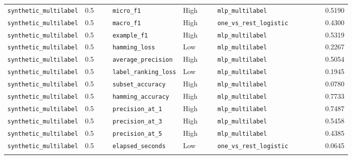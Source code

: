 \documentclass[11pt]{article}
\begin{document}
\begin{longtable}{p{0.18\linewidth} p{0.08\linewidth} p{0.20\linewidth} p{0.10\linewidth} p{0.25\linewidth} r}
\texttt{synthetic\_multilabel} & 0.5 & \texttt{micro\_f1} & High & \texttt{mlp\_multilabel} & 0.5190 \\
\texttt{synthetic\_multilabel} & 0.5 & \texttt{macro\_f1} & High & \texttt{one\_vs\_rest\_logistic} & 0.4300 \\
\texttt{synthetic\_multilabel} & 0.5 & \texttt{example\_f1} & High & \texttt{mlp\_multilabel} & 0.5319 \\
\texttt{synthetic\_multilabel} & 0.5 & \texttt{hamming\_loss} & Low & \texttt{mlp\_multilabel} & 0.2267 \\
\texttt{synthetic\_multilabel} & 0.5 & \texttt{average\_precision} & High & \texttt{mlp\_multilabel} & 0.5054 \\
\texttt{synthetic\_multilabel} & 0.5 & \texttt{label\_ranking\_loss} & Low & \texttt{mlp\_multilabel} & 0.1945 \\
\texttt{synthetic\_multilabel} & 0.5 & \texttt{subset\_accuracy} & High & \texttt{mlp\_multilabel} & 0.0780 \\
\texttt{synthetic\_multilabel} & 0.5 & \texttt{hamming\_accuracy} & High & \texttt{mlp\_multilabel} & 0.7733 \\
\texttt{synthetic\_multilabel} & 0.5 & \texttt{precision\_at\_1} & High & \texttt{mlp\_multilabel} & 0.7487 \\
\texttt{synthetic\_multilabel} & 0.5 & \texttt{precision\_at\_3} & High & \texttt{mlp\_multilabel} & 0.5458 \\
\texttt{synthetic\_multilabel} & 0.5 & \texttt{precision\_at\_5} & High & \texttt{mlp\_multilabel} & 0.4385 \\
\texttt{synthetic\_multilabel} & 0.5 & \texttt{elapsed\_seconds} & Low & \texttt{one\_vs\_rest\_logistic} & 0.0645 \\
\addlinespace


\end{longtable}
\end{document}
